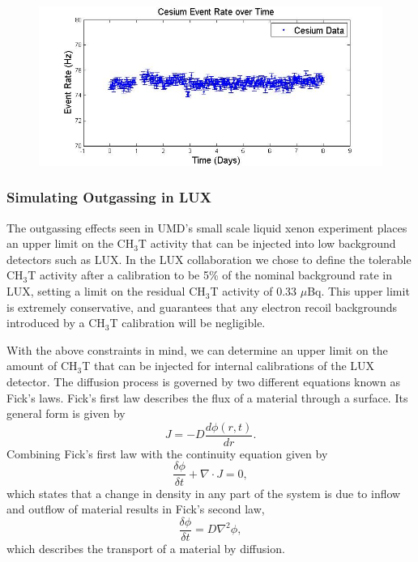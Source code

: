 \documentclass[a4paper,12pt]{article}
\begin{document}
{\begin{figure}
\includegraphics[scale=.35]{Cesium_TimeHisto.jpg} 
\label{UMDCsData}
\end{figure}

\subsubsection{Simulating Outgassing in LUX} \label{SimOutgas}

The outgassing effects seen in UMD's small scale liquid xenon experiment places an upper limit on the CH$_3$T activity that can be injected into low background detectors such as LUX.   In the LUX collaboration we chose to define the tolerable CH$_3$T activity after a calibration to be 5\% of the nominal background rate in LUX, setting a limit on the residual CH$_3$T activity of 0.33 $\mu$Bq.  This upper limit is extremely conservative, and guarantees that any electron recoil backgrounds introduced by a CH$_3$T calibration will be negligible. 

With the above constraints in mind, we can determine an upper limit on the amount of CH$_3$T that can be injected for internal calibrations of the LUX detector. The diffusion process is governed by two different equations known as Fick's laws. Fick's first law describes the flux of a material through a surface. Its general form is given by
\begin{equation}
J=-D\frac{d \phi(r,t)}{d r}.
\end{equation}
Combining Fick's first law with the continuity equation given by
\begin{equation}
\frac{\delta \phi}{\delta t} + \nabla \cdot J = 0,
\end{equation}
which states that a change in density in any part of the system is due to inflow and outflow of material results in Fick's second law,
\begin{equation}
\frac{\delta \phi}{\delta t} = D \nabla^2 \phi,
\end{equation}
which describes the transport of a material by diffusion.

}
\end{document}
